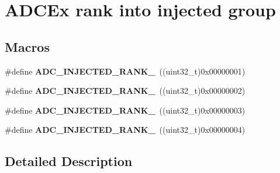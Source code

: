\hypertarget{group___a_d_c_ex__injected__rank}{\section{A\-D\-C\-Ex rank into injected group}
\label{group___a_d_c_ex__injected__rank}
}
\subsection*{Macros}
\begin{DoxyCompactItemize}
\item 
\hypertarget{group___a_d_c_ex__injected__rank_gabe6252325fda6b22c794ea7b0e974ee3}{\#define {\bfseries A\-D\-C\-\_\-\-I\-N\-J\-E\-C\-T\-E\-D\-\_\-\-R\-A\-N\-K\-\_}~((uint32\-\_\-t)0x00000001)}\label{group___a_d_c_ex__injected__rank_gabe6252325fda6b22c794ea7b0e974ee3}

\item 
\hypertarget{group___a_d_c_ex__injected__rank_gaf065faf92e099a1667694233384d187e}{\#define {\bfseries A\-D\-C\-\_\-\-I\-N\-J\-E\-C\-T\-E\-D\-\_\-\-R\-A\-N\-K\-\_}~((uint32\-\_\-t)0x00000002)}\label{group___a_d_c_ex__injected__rank_gaf065faf92e099a1667694233384d187e}

\item 
\hypertarget{group___a_d_c_ex__injected__rank_ga5fa8c3014caccae280220fd3df5d7f23}{\#define {\bfseries A\-D\-C\-\_\-\-I\-N\-J\-E\-C\-T\-E\-D\-\_\-\-R\-A\-N\-K\-\_}~((uint32\-\_\-t)0x00000003)}\label{group___a_d_c_ex__injected__rank_ga5fa8c3014caccae280220fd3df5d7f23}

\item 
\hypertarget{group___a_d_c_ex__injected__rank_gaffe7c5042c696b39ef23fba9af5a88b9}{\#define {\bfseries A\-D\-C\-\_\-\-I\-N\-J\-E\-C\-T\-E\-D\-\_\-\-R\-A\-N\-K\-\_}~((uint32\-\_\-t)0x00000004)}\label{group___a_d_c_ex__injected__rank_gaffe7c5042c696b39ef23fba9af5a88b9}

\end{DoxyCompactItemize}


\subsection{Detailed Description}
